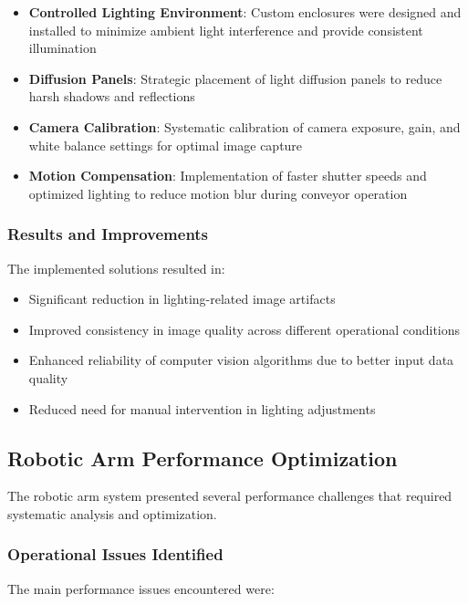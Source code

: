 \documentclass{book}
\begin{document}
\begin{itemize}
\item \textbf{Controlled Lighting Environment}: Custom enclosures were designed and installed to minimize ambient light interference and provide consistent illumination
\item \textbf{Diffusion Panels}: Strategic placement of light diffusion panels to reduce harsh shadows and reflections
\item \textbf{Camera Calibration}: Systematic calibration of camera exposure, gain, and white balance settings for optimal image capture
\item \textbf{Motion Compensation}: Implementation of faster shutter speeds and optimized lighting to reduce motion blur during conveyor operation
\end{itemize}

\subsubsection{Results and Improvements}
\par\noindent The implemented solutions resulted in:

\begin{itemize}
\item Significant reduction in lighting-related image artifacts
\item Improved consistency in image quality across different operational conditions
\item Enhanced reliability of computer vision algorithms due to better input data quality
\item Reduced need for manual intervention in lighting adjustments
\end{itemize}

\subsection{Robotic Arm Performance Optimization}

\par\noindent The robotic arm system presented several performance challenges that required systematic analysis and optimization.

\subsubsection{Operational Issues Identified}
\par\noindent The main performance issues encountered were:
\end{document}
